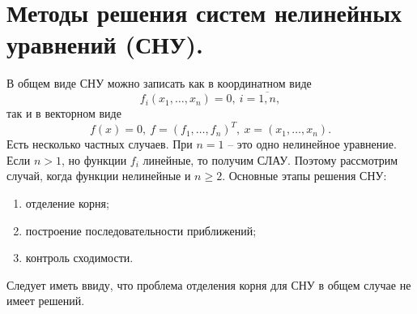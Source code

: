 \documentclass[a4paper, 12pt]{report}
\numberwithin{equation}{section}
\renewcommand{\geq}{\geqslant}
\begin{document}
\section{Методы решения систем нелинейных уравнений (СНУ).}
В общем виде СНУ можно записать как в координатном виде 
\begin{equation}
	f_i(x_1,\ldots, x_n) = 0,\ i=\overline{1,n},
\end{equation}
так и в векторном виде 
\begin{equation}
	f(x) = 0,\ f=(f_1,\ldots, f_n)^T,\ x = (x_1,\ldots, x_n).\tag{1}
\end{equation}
Есть несколько частных случаев. При $n=1$ -- это одно нелинейное уравнение. Если $n>1$, но функции $f_i$ линейные, то получим СЛАУ. Поэтому рассмотрим случай, когда функции нелинейные и $n\geq 2$. Основные этапы решения СНУ:
\begin{enumerate}
	\item отделение корня;
	\item построение последовательности приближений;
	\item контроль сходимости.
\end{enumerate}
Следует иметь ввиду, что проблема отделения корня для СНУ в общем случае не имеет решений.
\end{document}
